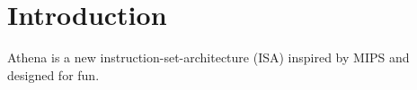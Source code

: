 \chapter{Introduction}

Athena is a new instruction-set-architecture (ISA) inspired by MIPS and designed for fun.

